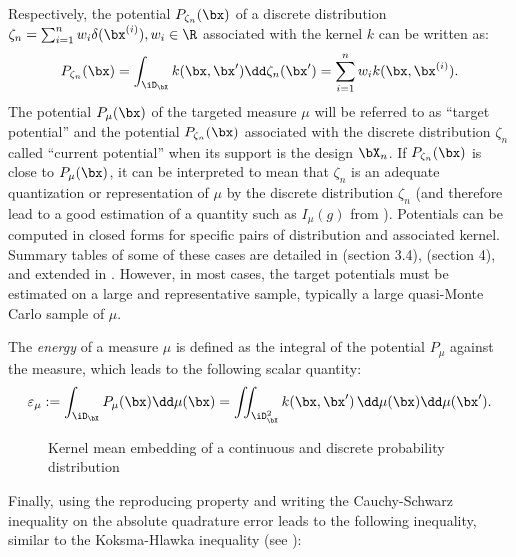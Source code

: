 Respectively, the potential $P_{\zeta_n}(\bx)$ of a discrete distribution $\zeta_n = \sum_{i=1}^{n} w_i \delta(\bx^{(i)}), w_i \in \R$ associated with the kernel $k$ can be written as:
\begin{equation}\label{eq:potential}
    P_{\zeta_n}(\bx) =  \int_{\iD_{\bX}} k(\bx, \bx') \dd \zeta_n(\bx') = \sum_{i=1}^{n} w_i k(\bx, \bx^{(i)}).
\end{equation}
The potential $P_{\mu}(\bx)$ of the targeted measure $\mu$ will be referred to as ``target potential'' and the potential $P_{\zeta_n}(\bx)$ associated with the discrete distribution $\zeta_n$ called ``current potential'' when its support is the design $\bX_n$. 
If $P_{\zeta_n}(\bx)$ is close to $P_{\mu}(\bx)$, it can be interpreted to mean that $\zeta_n$ is an adequate quantization or representation of $\mu$ by the discrete distribution $\zeta_n$ (and therefore lead to a good estimation of a quantity such as $I_{\mu}(g)$ from ). 
Potentials can be computed in closed forms for specific pairs of distribution and associated kernel. 
Summary tables of some of these cases are detailed in \cite{briol_phd_2019} (section 3.4), \cite{pronzato_zhigljavsky_2020} (section 4), and extended in \cite{fekhari_iooss_2023}. 
However, in most cases, the target potentials must be estimated on a large and representative sample, typically a large quasi-Monte Carlo sample of $\mu$.

\medskip
\begin{definition}
The \emph{energy} of a measure $\mu$ is defined as the integral of the potential $P_\mu$ against the measure, which leads to the following scalar quantity:
\begin{equation}
    \varepsilon_\mu:= \int_{\iD_{\bX}} P_{\mu}(\bx) \dd \mu(\bx) = \iint_{\iD_{\bX}^2} k(\bx, \bx')\, \dd\mu(\bx) \dd\mu(\bx').
\end{equation}
\label{eq:target_energy}
\end{definition}

\begin{figure}[!h]
    \centering
    
    \caption{Kernel mean embedding of a continuous and discrete probability distribution}
    \label{fig:kernel_mean_embedding}
\end{figure}
Finally, using the reproducing property and writing the Cauchy-Schwarz inequality on the absolute quadrature error leads to the following inequality, similar to the Koksma-Hlawka inequality  (see \cite{briol_oates_2019}): 

